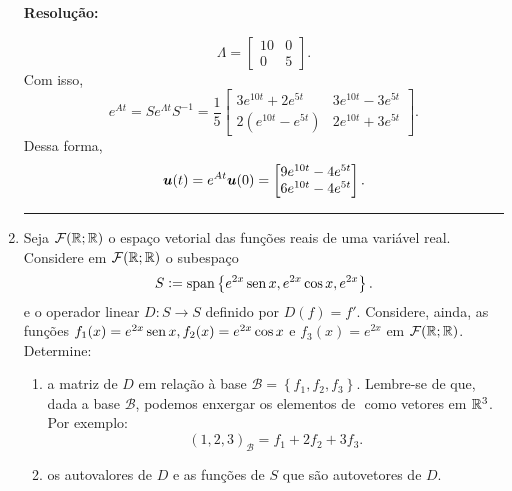 \documentclass[leqno]{article}
\numberwithin{equation}{section}
\newenvironment{sol} 
{
    \vspace{4mm}
    \noindent\textbf{Resolução:}
    \strut\newline
    \smallskip
    \hspace{-3.5mm} 
} 
{\noindent\rule{4cm}{.1mm}}
\begin{document}
\begin{enumerate}
\begin{sol}
\begin{equation*}
        \Lambda =
        \begin{bmatrix}
            10 & 0 \\
            0 & 5
        \end{bmatrix}
    .\end{equation*}
    Com isso,
    \begin{equation*}
        e^{ At } = S e^{ \Lambda t } S^{ -1 } =
        \frac{ 1 }{ 5 }
        \begin{bmatrix}
            3 e^{ 10 t } + 2 e^{ 5 t } & 3 e^{ 10 t } - 3 e^{ 5 t } \\
            2 ( e^{ 10 t } - e ^{ 5t } ) & 2 e^{ 10t } + 3  e^{ 5t }
        \end{bmatrix}
    .\end{equation*}
    Dessa forma,
    \begin{equation*}
        \boldsymbol{u} ( t ) = e^{ At } \boldsymbol{u} ( 0 ) =
        \begin{bmatrix}
            9 e^{ 10 t } - 4 e^{ 5 t } \\
            6 e^{ 10 t } - 4 e^{ 5 t }
        \end{bmatrix}
    .\end{equation*}
\end{sol}


\item Seja \( \mathcal{F} ( \mathbb{R}; \mathbb{R} ) \) o espaço vetorial das funções reais de uma variável real.
    Considere em \( \mathcal{F} ( \mathbb{R}; \mathbb{R} ) \) o subespaço
    \begin{equation*}
        S \vcentcolon= \operatorname{span} \left\{ e^{ 2x } \operatorname{sen} x, e^{ 2x } \cos x, e^{ 2x } \right\}
    .\end{equation*}
    e o operador linear \( D : S \to S \) definido por \( D ( f ) = f' \).
    Considere, ainda, as funções \( f_{ 1 } ( x ) = e^{ 2x } \operatorname{sen} x, f_{ 2 } ( x ) = e^{ 2x } \cos x \) e \( f_{ 3 } ( x ) = e^{ 2x } \) em \( \mathcal{F} ( \mathbb{R}; \mathbb{R} ) \).
    Determine:
    \begin{enumerate}[label=(\alph*)]
        \item a matriz de \( D \) em relação à base \( \mathcal{B} = \left\{ f_{ 1 }, f_{ 2 }, f_{ 3 } \right\} \).
            Lembre-se de que, dada a base \( \mathcal{B} \), podemos enxergar os elementos de \(  \) como vetores em \( \mathbb{R}^{ 3 } \).
            Por exemplo:
            \begin{equation*}
                ( 1, 2, 3 )_{ \mathcal{B} } = f_{ 1 } + 2f_{ 2 } + 3f_{ 3 }
            .\end{equation*}
        \item os autovalores de \( D \) e as funções de \( S \) que são autovetores de \( D \).
    \end{enumerate}


\end{enumerate}
\end{document}
